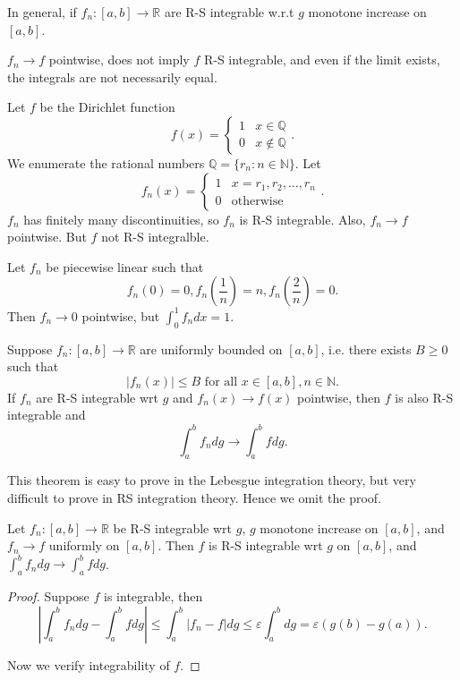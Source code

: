 In general, if $f_n : [a,b] \to \mathbb{R}$ are R-S integrable w.r.t $g$ monotone increase on $[a,b]$.

$f_n \to f$ pointwise, does not imply $f$ R-S integrable, and even if the limit exists, the integrals are not necessarily equal.

\begin{example}
	Let  $f$ be the Dirichlet function
	\[
		f(x) = \begin{cases}
			1 & x \in \mathbb{Q}\\
			0 & x \not\in \mathbb{Q}
		\end{cases}
	.\] 
	We enumerate the rational numbers $\mathbb{Q} = \{r_n: n \in \mathbb{N}\} $. Let
	\[
		f_n(x) = \begin{cases}
			1 & x = r_1, r_2, \ldots, r_n \\
			0 & \text{otherwise}
		\end{cases}
	.\] 
	$f_n$ has finitely many discontinuities, so $f_n$ is R-S integrable. Also, $f_n \to f$ pointwise. But $f$ not R-S integralble.
\end{example}

\begin{example}
	Let $f_n$ be piecewise linear such that
	\[
		f_n(0) = 0, f_n(\frac{1}{n}) = n, f_n(\frac{2}{n}) = 0
	.\] 
	Then $f_n \to  0$ pointwise, but $\int_0^1 f_n dx = 1$.
\end{example}

\begin{theorem}
	Suppose $f_n: [a,b] \to \mathbb{R}$ are uniformly bounded on $[a,b]$, i.e. there exists $B\ge 0$ such that
	\[
		|f_n(x)| \le B \text{ for all }x \in [a,b], n \in \mathbb{N}
	.\] 
	If $f_n$ are R-S integrable wrt $g$ and $f_n (x) \to  f(x)$ pointwise, then $f$ is also R-S integrable and  \[
		\int _a^b f_n dg \to \int _a^b f dg
	.\] 
\end{theorem}

This theorem is easy to prove in the Lebesgue integration theory, but very difficult to prove in RS integration theory. Hence we omit the proof.

\begin{theorem}
	Let $f_n: [a,b] \to \mathbb{R}$ be R-S integrable wrt $g$, $g$ monotone increase on $[a,b]$, and $f_n \to f$ uniformly on $[ a,b]$. Then $f$ is R-S integrable wrt $g$ on $[a,b]$, and $\int _a^b f_n dg \to  \int _a^b f dg$.
\end{theorem}
\begin{proof}
	Suppose $f$ is integrable, then
	\[
		\left| \int _a^b f_n dg - \int _a^b f dg  \right| \le \int _a^b \left| f_n - f \right| dg \le  \varepsilon \int _a^b dg = \varepsilon (g(b) - g(a))
	.\] 

	Now we verify integrability of $f$.
\end{proof}


